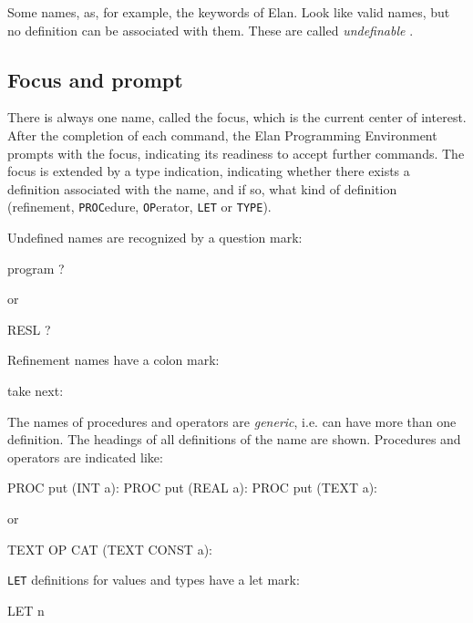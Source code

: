 Some names, as, for example, the keywords of Elan. Look like
valid names, but no definition can be associated with them. These
are called {\em undefinable} .

\subsection{Focus and prompt}

There is always one name, called the focus, which is the current
center of interest. After the completion of each command, the
Elan Programming Environment prompts with the focus, indicating
its readiness to accept further commands. The focus is extended
by a type indication, indicating whether there exists a definition
associated with the name, and if so, what kind of definition
(refinement, {\tt PROC}edure, {\tt OP}erator, {\tt LET} or {\tt TYPE}).

Undefined names are recognized by a question mark:

\begin{elan}
        program ?\cursor
\end{elan}

\noindent
or

\begin{elan}
        RESL ?\cursor
\end{elan}

\noindent
Refinement names have a colon mark:

\begin{elan}
        take next:\cursor
\end{elan}

\noindent
The names of procedures and operators are {\em generic}, i.e.
can have more than one definition. The headings of all definitions
of the name are shown. Procedures and operators are indicated
like: 

\begin{elan}
        PROC put (INT a):\cursor
        PROC put (REAL a):
        PROC put (TEXT a):
\end{elan}

\noindent
or

\begin{elan}
        TEXT OP CAT (TEXT CONST a):\cursor
\end{elan}

{\tt LET} definitions for values and types have a let mark:

\begin{elan}
        LET n\cursor
\end{elan}


